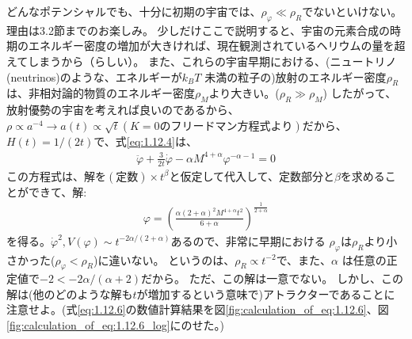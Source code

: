 \documentclass[11pt]{ltjsarticle}
\theoremstyle{plain}
\theoremstyle{break}
\begin{document}
どんなポテンシャルでも、十分に初期の宇宙では、$\rho_{\varphi} \ll \rho_{R}$でないといけない。
理由は3.2節までのお楽しみ。
少しだけここで説明すると、宇宙の元素合成の時期のエネルギー密度の増加が大きければ、現在観測されているヘリウムの量を超えてしまうから（らしい）。
また、これらの宇宙早期における、(ニュートリノ(neutrinos)のような、エネルギーが$k_{B} T$ 未満の粒子の)放射のエネルギー密度$\rho_{R}$は、非相対論的物質のエネルギー密度$\rho_{M}$より大きい。($\rho_{R}\gg \rho_{M}$)
したがって、放射優勢の宇宙を考えれば良いのであるから、$\rho \propto a^{-4} \rightarrow a(t)\propto \sqrt{t} (K=0 のフリードマン方程式より)$だから、$H(t)=1/(2t)$で、式\eqref{eq:1.12.4}は、
\begin{align}
  \ddot{\varphi}+\frac{3}{2 t} \dot{\varphi}-\alpha M^{4+\alpha} \varphi^{-\alpha-1}=0 \label{eq:1.12.6}
\end{align}%
この方程式は、解を$(定数)\times t^{\beta}$と仮定して代入して、定数部分と$\beta$を求めることができて、解:
\begin{align}
  \varphi=\left(\frac{\alpha(2+\alpha)^{2} M^{4+\alpha} t^{2}}{6+\alpha}\right)^{\frac{1}{2+\alpha}} \label{eq:1.12.7}
\end{align}%
を得る。$\dot{\varphi}^2 ,V(\varphi)\sim t^{-2\alpha/(2+\alpha)}$あるので、非常に早期における $\rho_{\varphi}$は$\rho_{R}$より小さかった($\rho_{\varphi}<\rho_{R}$)に違いない。
というのは、$\rho_{R} \propto t^{-2}$で、また、$\alpha $ は任意の正定値で$-2<-2\alpha/(\alpha+2)$だから。
ただ、この解は一意でない。
しかし、この解は(他のどのような解も$t$が増加するという意味で)アトラクターであることに注意せよ。(式\eqref{eq:1.12.6}の数値計算結果を図\ref{fig:calculation_of_eq:1.12.6}、図\ref{fig:calculation_of_eq:1.12.6_log}にのせた。)
\end{document}
